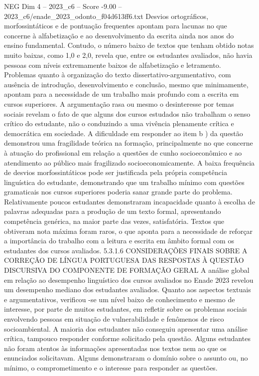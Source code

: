 \begin{textsample}{NEG Dim 4 – 2023\_c6 – Score -9.00 – 2023\_c6/enade\_2023\_odonto\_f04d613ff6.txt}
Desvios ortográficos, morfossintáticos e de pontuação frequentes apontam para lacunas no que concerne à alfabetização e ao desenvolvimento da escrita ainda nos anos do ensino fundamental.
Contudo, o número baixo de textos que tenham obtido notas muito baixas, como 1,0 e 2,0, revela que, entre os estudantes avaliados, não havia pessoas com níveis extremamente baixos de alfabetização e letramento.
Problemas quanto à organização do texto dissertativo-argumentativo, com ausência de introdução, desenvolvimento e conclusão, mesmo que minimamente, apontam para a necessidade de um trabalho mais profundo com a escrita em cursos superiores.
A argumentação rasa ou mesmo o desinteresse por temas sociais revelam o fato de que alguns dos cursos estudados não trabalham o senso crítico do estudante, não o conduzindo a uma vivência plenamente crítica e democrática em sociedade.
A dificuldade em responder ao item b ) da questão demonstrou uma fragilidade teórica na formação, principalmente no que concerne à atuação do profissional em relação a questões de cunho socioeconômico e ao atendimento ao público mais fragilizado socioeconomicamente.
A baixa frequência de desvios morfossintáticos pode ser justificada pela própria competência linguística do estudante, demonstrando que um trabalho mínimo com questões gramaticais nos cursos superiores poderia sanar grande parte do problema.
Relativamente poucos estudantes demonstraram incapacidade quanto à escolha de palavras adequadas para a produção de um texto formal, apresentando competência genérica, na maior parte das vezes, satisfatória.
Textos que obtiveram nota máxima foram raros, o que aponta para a necessidade de reforçar a importância do trabalho com a leitura e escrita em âmbito formal com os estudantes dos cursos avaliados. 5.3.1.6 CONSIDERAÇÕES FINAIS SOBRE A CORREÇÃO DE LÍNGUA PORTUGUESA DAS RESPOSTAS À QUESTÃO DISCURSIVA DO COMPONENTE DE FORMAÇÃO GERAL A análise global em relação ao desempenho linguístico dos cursos avaliados no Enade 2023 revelou um desempenho mediano dos estudantes avaliados.
Quanto aos aspectos textuais e argumentativos, verificou -se um nível baixo de conhecimento e mesmo de interesse, por parte de muitos estudantes, em refletir sobre os problemas sociais envolvendo pessoas em situação de vulnerabilidade e fenômenos de risco socioambiental.
A maioria dos estudantes não conseguiu apresentar uma análise crítica, tampouco responder conforme solicitado pela questão.
Alguns estudantes não foram atentos às informações apresentadas nos textos nem ao que os enunciados solicitavam.
Alguns demonstraram o domínio sobre o assunto ou, no mínimo, o comprometimento e o interesse para responder as questões.

\end{textsample}
